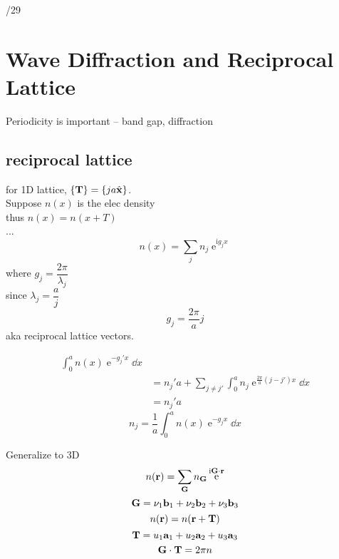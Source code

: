\documentclass[UTF8]{ctexart} %
\DeclareMathOperator{\e}{\mathrm{e}}
\renewcommand{\I}{\mathrm{i}}
\numberwithin{equation}{section}
\begin{document}
/29\\
\section{Wave Diffraction and Reciprocal Lattice}
Periodicity is important -- band gap, diffraction\\

\subsection{reciprocal lattice}
for 1D lattice, $ \{\vb{T}\} = \{ja\hat{\vb{x}}\} $.\\
Suppose $ n(x) $ is the elec density\\
thus $ n(x) = n(x+T) $\\
...
\begin{equation}\label{key}
n(x) = \sum_j n_j\e^{\I g_j x}
\end{equation}
where $ g_j = \dfrac{2\pi}{\lambda_j} $\\
since $ \lambda_j = \dfrac{a}{j} $
\begin{equation}\label{key}
g_j = \dfrac{2\pi}{a}j
\end{equation}
aka reciprocal lattice vectors.

\begin{equation}\label{key}
\begin{aligned}
\int_0^a n(x)\e^{-g_j' x}\dd x\\
&= n_j' a + \sum_{j\neq j'}\int_0^a n_j \e^{\tfrac{2\pi}{a}(j - j')x}\dd x\\
&= n_j' a
\end{aligned}
\end{equation}
\begin{equation}\label{key}
n_j = \dfrac{1}{a}\int_0^a n(x)\e^{-g_j x}\dd x
\end{equation}

Generalize to 3D\\
\begin{equation}\label{key}
n(\vb{r}) = \sum_{\vb{G}} n_{\vb{G}}\e^{\I\vb{G}\cdot\vb{r}}
\end{equation}
\begin{equation}\label{key}
\vb{G} = \nu_1 \vb{b}_1 + \nu_2 \vb{b}_2 + \nu_3 \vb{b}_3
\end{equation}
\begin{equation}\label{key}
n(\vb{r}) = n(\vb{r} + \vb{T})
\end{equation}
\begin{equation}\label{key}
\vb{T} = u_1\vb{a}_1 + u_2\vb{a}_2 + u_3\vb{a}_3
\end{equation}
\begin{equation}\label{key}
\vb{G}\cdot\vb{T} = 2\pi n
\end{equation}
\end{document}
